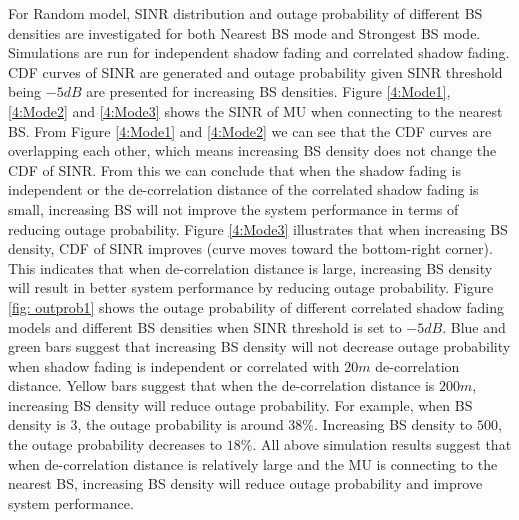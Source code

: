  \par For Random model, SINR distribution and outage probability of different BS densities are investigated for both Nearest BS mode and Strongest BS mode. Simulations are run for independent shadow fading and correlated shadow fading. CDF curves of SINR are generated and outage probability given SINR threshold being $-5dB$ are presented for increasing BS densities. Figure \ref{4:Mode1}, \ref{4:Mode2} and \ref{4:Mode3} shows the SINR of MU when connecting to the nearest BS. From Figure \ref{4:Mode1} and \ref{4:Mode2} we can see that the CDF curves are overlapping each other, which means increasing BS density does not change the CDF of SINR. From this we can conclude that when the shadow fading is independent or the de-correlation distance of the correlated shadow fading is small, increasing BS will not improve the system performance in terms of reducing outage probability. Figure \ref{4:Mode3}  illustrates that when increasing BS density, CDF of SINR improves (curve moves toward the bottom-right corner). This indicates that when de-correlation distance is large, increasing BS density will result in better system performance by reducing outage probability. Figure \ref{fig: outprob1} shows the outage probability of different correlated shadow fading models and different BS densities when SINR threshold is set to $-5dB$. Blue and green bars suggest that increasing BS density will not decrease outage probability when shadow fading is independent or correlated with $20m$ de-correlation distance. Yellow bars suggest that when the de-correlation distance is $200m$, increasing BS density will reduce outage probability. For example, when BS density is $3$, the outage probability is around $38\%$. Increasing BS density to $500$, the outage probability decreases to $18\%$. All above simulation results suggest that when de-correlation distance is relatively large and the MU is connecting to the nearest BS, increasing BS density will reduce outage probability and improve system performance.



